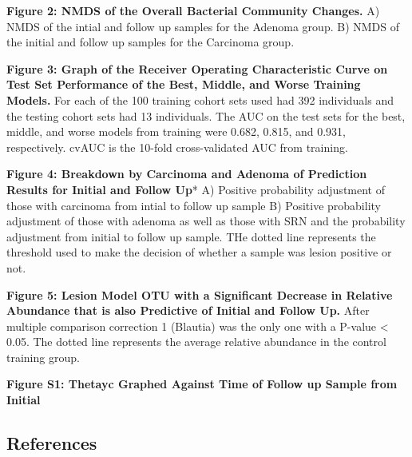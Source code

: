 \documentclass[12pt,]{article}
\begin{document}
\textbf{Figure 2: NMDS of the Overall Bacterial Community Changes.} A)
NMDS of the intial and follow up samples for the Adenoma group. B) NMDS
of the initial and follow up samples for the Carcinoma group.

\textbf{Figure 3: Graph of the Receiver Operating Characteristic Curve
on Test Set Performance of the Best, Middle, and Worse Training Models.}
For each of the 100 training cohort sets used had 392 individuals and
the testing cohort sets had 13 individuals. The AUC on the test sets for
the best, middle, and worse models from training were 0.682, 0.815, and
0.931, respectively. cvAUC is the 10-fold cross-validated AUC from
training.

\textbf{Figure 4: Breakdown by Carcinoma and Adenoma of Prediction
Results for Initial and Follow Up}* A) Positive probability adjustment
of those with carcinoma from intial to follow up sample B) Positive
probability adjustment of those with adenoma as well as those with SRN
and the probability adjustment from initial to follow up sample. THe
dotted line represents the threshold used to make the decision of
whether a sample was lesion positive or not.

\textbf{Figure 5: Lesion Model OTU with a Significant Decrease in
Relative Abundance that is also Predictive of Initial and Follow Up.}
After multiple comparison correction 1 (Blautia) was the only one with a
P-value \textless{} 0.05. The dotted line represents the average
relative abundance in the control training group.

\newpage

\textbf{Figure S1: Thetayc Graphed Against Time of Follow up Sample from
Initial}

\newpage

\subsection{References}\label{references}
\end{document}
